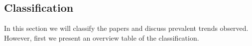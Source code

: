 \subsection{Classification}%
\label{sub:classification}
In this section we will classify the papers and discuss prevalent trends observed.
However, first we present an overview table of the classification.
